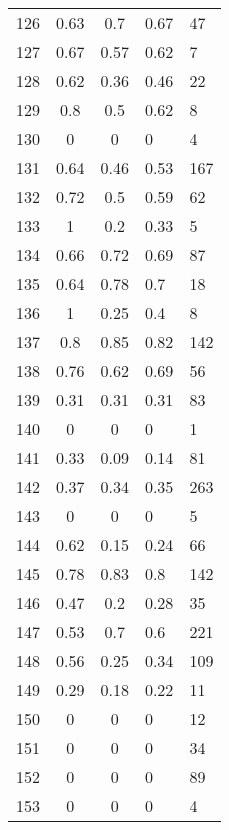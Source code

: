 \begin{longtable}[c]{|l|c|c|l|l|}
	126      & 0.63      & 0.7    & 0.67     & 47      \\
	127      & 0.67      & 0.57   & 0.62     & 7       \\
	128      & 0.62      & 0.36   & 0.46     & 22      \\
	129      & 0.8       & 0.5    & 0.62     & 8       \\
	130      & 0         & 0      & 0        & 4       \\
	131      & 0.64      & 0.46   & 0.53     & 167     \\
	132      & 0.72      & 0.5    & 0.59     & 62      \\
	133      & 1         & 0.2    & 0.33     & 5       \\
	134      & 0.66      & 0.72   & 0.69     & 87      \\
	135      & 0.64      & 0.78   & 0.7      & 18      \\
	136      & 1         & 0.25   & 0.4      & 8       \\
	137      & 0.8       & 0.85   & 0.82     & 142     \\
	138      & 0.76      & 0.62   & 0.69     & 56      \\
	139      & 0.31      & 0.31   & 0.31     & 83      \\
	140      & 0         & 0      & 0        & 1       \\
	141      & 0.33      & 0.09   & 0.14     & 81      \\
	142      & 0.37      & 0.34   & 0.35     & 263     \\
	143      & 0         & 0      & 0        & 5       \\
	144      & 0.62      & 0.15   & 0.24     & 66      \\
	145      & 0.78      & 0.83   & 0.8      & 142     \\
	146      & 0.47      & 0.2    & 0.28     & 35      \\
	147      & 0.53      & 0.7    & 0.6      & 221     \\
	148      & 0.56      & 0.25   & 0.34     & 109     \\
	149      & 0.29      & 0.18   & 0.22     & 11      \\
	150      & 0         & 0      & 0        & 12      \\
	151      & 0         & 0      & 0        & 34      \\
	152      & 0         & 0      & 0        & 89      \\
	153      & 0         & 0      & 0        & 4       \\

\end{longtable}
